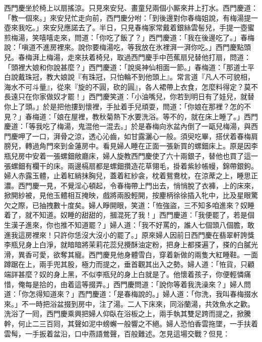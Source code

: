 西門慶坐於椅上以扇搖涼。只見來安兒、畫童兒兩個小厮來井上打水。西門慶道：「教一個來。」來安兒忙走向前，西門慶分咐：「到後邊對你春梅姐說，有梅湯提一壺來我吃。」來安兒應諾去了。半日，只見春梅家常戴着銀絲雲髻兒，手提一壺蜜煎梅湯，笑嘻嘻走來，{}問道：「你吃了飯了？」西門慶道：「我在後邊吃了。」春梅說：「嗔道不進房裡來。說你要梅湯吃，等我放在氷裡湃一湃你吃。」{}西門慶點頭兒。春梅湃上梅湯，走來扶着椅兒，取過西門慶手中芭蕉扇兒替他打扇，{}問道：「頭裡大娘和你說甚麼？」{}西門慶道：「說吳神仙相面一節。」春梅道：「那道士平白說戴珠冠，教大娘說『有珠冠，只怕輪不到他頭上』。常言道『凡人不可貌相，海水不可斗量』，從來『旋的不圓，砍的圓』，各人裙帶上衣食，怎麼料得定？莫不長遠只在你家做奴才罷！」{}{}西門慶笑道：「小油嘴兒，你若到明日有了娃兒，就替你上了頭。」於是把他摟到懷裡，手扯着手兒頑耍，問道：「你娘在那裡？怎的不見？」春梅道：「娘在屋裡，教秋菊熱下水要洗浴。等不的，就在床上睡了。」西門慶道：「等我吃了梅湯，鬼混他一混去。」於是春梅向氷盆內倒了一甌兒梅湯，與西門慶呷了一口，湃骨之涼，透心沁齒，如甘露灑心一般。須臾吃畢，搭伏着春梅肩膀兒，轉過角門來到金蓮房中。看見婦人睡在正面一張新買的螺鈿床上。原是因李瓶兒房中安着一張螺鈿敞廳床，婦人旋教西門慶使了六十兩銀子，替他也買了這一張螺鈿有欄干的床。兩邊槅扇都是螺鈿攢造花草翎毛，掛着紫紗帳幔，錦帶銀鉤。婦人赤露玉體，止着紅綃抹胸兒，{}蓋着紅紗衾，枕着鴛鴦枕，在涼蓆之上，睡思正濃。西門慶一見，不覺淫心頓起，令春梅帶上門出去，悄悄脫了衣褲，上的床來，掀開紗被，見他玉體相互掩映，戲將兩股輕開，按麈柄徐徐插入牝中，比及星眼驚欠之際，已抽拽數十度矣。婦人睜開眼，笑道：「恠強盜，三不知多咱進來？奴睡着了，就不知道。奴睡的甜甜的，摑混死了我！」{}西門慶道：「我便罷了，若是個生漢子進來，你也推不知道罷？」{}婦人道：「我不好罵的，誰人七個頭八個膽，敢進我這房裡來！只許你恁沒大沒小的罷了。」原來婦人因前日西門慶在翡翠軒誇獎李瓶兒身上白淨，就暗暗將茉莉花蕊兒攪酥油定粉，把身上都搽遍了，{}搽的白膩光滑，異香可愛，欲奪其寵。西門慶見他身體雪白，穿着新做的兩隻大紅睡鞋。一面蹲踞在上，兩手兜其股，極力而提之，垂首觀其出入之勢。婦人道：「恠貨，只顧端詳甚麼？奴的身上黑，不似李瓶兒的身上白就是了。他懷着孩子，你便輕憐痛惜，俺每是拾的，由着這等掇弄。」{}西門慶問道：「說你等着我洗澡來？」婦人問道：「你怎得知道來？」西門慶道：「是春梅說的。」婦人道：「你洗，我叫春梅掇水來。」不一時把浴盆掇到房中，注了湯。二人下床來，同浴蘭湯，共效魚水之歡。洗浴了一囘，西門慶乘興把婦人仰臥在浴板之上，兩手執其雙足跨而提之，掀騰𢵞幹，何止二三百囘，其聲如泥中螃蠏一般響之不絕。婦人恐怕香雲拖墜，一手扶着雲髩，{}一手扳着盆沿，口中燕語鶯聲，百般難述。{}怎見這場交戰？但見：

